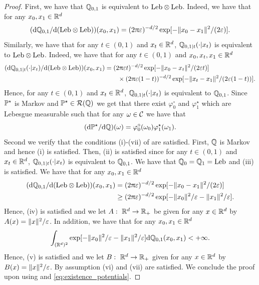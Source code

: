 \documentclass{article}
\begin{document}
\begin{proof}
First, we have that $\mathbb{Q}_{0,1}$ is equivalent to $\mathrm{Leb} \otimes \mathrm{Leb}$. Indeed, we have that for any $x_0, x_1 \in \mathbb{R}^d$
\begin{equation}
    (\mathrm{d} \mathbb{Q}_{0,1} / \mathrm{d} (\mathrm{Leb} \otimes \mathrm{Leb}))(x_0,x_1) =(2 \uppi \varepsilon)^{-d/2} \exp[-\| x_0 - x_1 \|^2 / (2 \varepsilon) ] . 
\end{equation}
Similarly, we have that for any $t \in (0,1)$ and $x_t \in \mathbb{R}^d$, $\mathbb{Q}_{0,1|t}(\cdot|x_t)$ is equivalent to $\mathrm{Leb} \otimes \mathrm{Leb}$. Indeed, we have that for any $t \in (0,1)$ and $x_0, x_t, x_1 \in \mathbb{R}^d$
\begin{align}
    (\mathrm{d} \mathbb{Q}_{0,1|t}(\cdot|x_t) / \mathrm{d} (\mathrm{Leb} \otimes \mathrm{Leb}))(x_0,x_1) &= (2 \uppi \varepsilon t)^{-d/2}  \exp[-\| x_0 - x_t \|^2 / (2 \varepsilon t)] \\
    & \qquad \times (2 \uppi \varepsilon(1-t))^{-d/2} \exp[- \| x_t -  x_1 \|^2 / (2 \varepsilon(1-t)) ] . 
\end{align}
Hence, for any $t \in (0,1)$ and $x_t \in \mathbb{R}^d$, $\mathbb{Q}_{0,1|t}(\cdot|x_t)$ is equivalent to $\mathbb{Q}_{0,1}$. Since $\mathbb{P}^\star$ is Markov and $\mathbb{P}^\star \in \mathcal{R}(\mathbb{Q})$ we get that there exist $\varphi^\circ_0$ and $\varphi^\star_1$ which are Lebesgue measurable such that for any $\omega \in \mathcal{C}$ we have that 
\begin{equation}
\label{eq:existence_potentials}
    (\rmd \Pbb^\star / \rmd \Qbb)(\omega) = \varphi_0^\circ(\omega_0) \varphi_1^\star(\omega_1) .
\end{equation}    
Second we verify that the conditions (i)-(vii) of \cite[Theorem 2.12]{leonard2014survey} are satisfied. First, $\mathbb{Q}$ is Markov and hence (i) is satisfied.
Then, (ii) is satisfied since for any $t \in (0,1)$ and $x_t \in \mathbb{R}^d$, $\mathbb{Q}_{0,1|t}(\cdot|x_t)$ is equivalent to $\mathbb{Q}_{0,1}$. 
We have that $\mathbb{Q}_0 = \mathbb{Q}_1 = \mathrm{Leb}$ and (iii) is satisfied. We have that for any $x_0, x_1 \in \mathbb{R}^d$
\begin{align}
    (\mathrm{d} \mathbb{Q}_{0,1} / \mathrm{d} (\mathrm{Leb} \otimes \mathrm{Leb}))(x_0,x_1) &= (2 \uppi \varepsilon)^{-d/2} \exp[-\| x_0 - x_1 \|^2 / (2 \varepsilon) ]\\
    &\geq (2 \uppi \varepsilon)^{-d/2} \exp[-\| x_0 \|^2/\varepsilon -\| x_1 \|^2/\varepsilon]. 
\end{align}
Hence, (iv) is satisfied and we let $A: \ \mathbb{R}^d \to \mathbb{R}_+$ be given for any $x \in \mathbb{R}^d$ by $A(x) = \| x \|^2 / \varepsilon$. 
In addition, we have that for any $x_0,x_1 \in \mathbb{R}^d$
\begin{equation}
     \int_{(\mathbb{R}^d)^2} \exp[-\| x_0 \|^2 / \varepsilon - \| x_1 \|^2 / \varepsilon] \mathrm{d} \mathbb{Q}_{0,1}(x_0,x_1) < +\infty . 
\end{equation}
Hence, (v) is satisfied and we let $B: \ \mathbb{R}^d \to \mathbb{R}_+$ given for any $x \in \mathbb{R}^d$ by $B(x) = \| x \|^2 / \varepsilon$. By assumption (vi) and (vii) are satisfied. We conclude the proof upon using \cite[Theorem 2.12-(b)]{leonard2014survey} and \eqref{eq:existence_potentials}. 
\end{proof}
\end{document}
